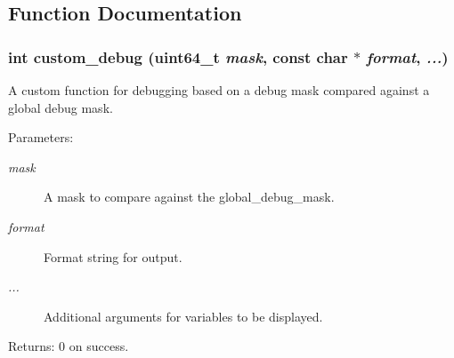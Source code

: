 \subsection{Function Documentation}
\subsubsection{\setlength{\rightskip}{0pt plus 5cm}int custom\_\-debug (uint64\_\-t {\em mask}, const char $\ast$ {\em format},  {\em ...})}\label{custom__debug_8h_a4090d810165be7e73bbed83b6ddde2e}


A custom function for debugging based on a debug mask compared against a global debug mask.

\begin{Desc}
\item[Parameters:]
\begin{description}
\item[{\em mask}]A mask to compare against the global\_\-debug\_\-mask. \item[{\em format}]Format string for output. \item[{\em ...}]Additional arguments for variables to be displayed. \end{description}
\end{Desc}
\begin{Desc}
\item[Returns:]0 on success. \end{Desc}
